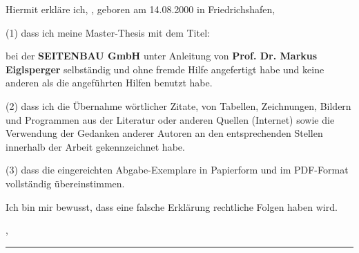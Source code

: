 \clearpage
\thispagestyle{plain}

\makeatletter

\vspace*{3\baselineskip}

\noindent
Hiermit erkläre ich, \@author, geboren am 14.08.2000 in
Friedrichshafen,

\bigskip
\bigskip

\noindent
(1) dass ich meine Master-Thesis mit dem Titel:

\medskip

\noindent
\textbf{\glqq\@title\grqq}

\medskip

\noindent
bei der \textbf{SEITENBAU GmbH} unter Anleitung von \textbf{Prof. Dr. Markus Eiglsperger}
selbständig und ohne fremde Hilfe angefertigt habe und keine anderen als die
angeführten Hilfen benutzt habe.

\bigskip
\bigskip

\noindent
(2) dass ich die Übernahme wörtlicher Zitate, von Tabellen, Zeichnungen, Bildern und
Programmen aus der Literatur oder anderen Quellen (Internet) sowie die Verwendung der
Gedanken anderer Autoren an den entsprechenden Stellen innerhalb der Arbeit
gekennzeichnet habe.

\bigskip
\bigskip

\noindent
(3) dass die eingereichten Abgabe-Exemplare in Papierform und im PDF-Format
vollständig übereinstimmen.

\bigskip
\bigskip

\noindent
Ich bin mir bewusst, dass eine falsche Erklärung rechtliche Folgen haben wird.

\vspace{5\baselineskip}

\noindent
\@doc@location, \@doc@date
\hfill
\rule{6cm}{0.4pt}

\makeatother
